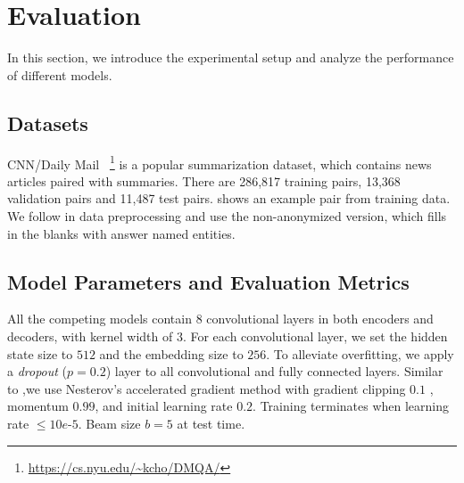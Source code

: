\section{Evaluation}
\label{sec:eval}
In this section, we introduce the experimental setup
and analyze the performance of different models.

\subsection{Datasets}
CNN/Daily Mail~\citep{HermannKGEKSB15}
\footnote{\url{https://cs.nyu.edu/~kcho/DMQA/}} 
is a popular summarization dataset, 
which contains news articles paired with summaries.
There are 286,817 training pairs,
13,368 validation pairs and 11,487 test pairs.
 shows an example pair from training data.
We follow \cite{SeeLM17} in data preprocessing and use 
the non-anonymized version, which fills in the blanks with answer named entities.


\subsection{Model Parameters and Evaluation Metrics}
\label{sec:expset}
All the competing models contain $8$ convolutional layers in
both encoders and decoders, with kernel width of $3$.
For each convolutional layer, 
we set the hidden state size to $512$ and the embedding size to $256$.
To alleviate overfitting,
we apply a \textit{dropout} ($p=0.2$) layer to 
all convolutional and fully connected layers.
Similar to \citep{gehring2017convs2s},we use Nesterov's
accelerated gradient method \citep{SutskeverMDH13} with gradient clipping $0.1$ \citep{PascanuMB13}, momentum $0.99$,
and initial learning rate $0.2$.
Training terminates when learning rate $\le 10e$-$5$.
Beam size $b=5$ at test time.

